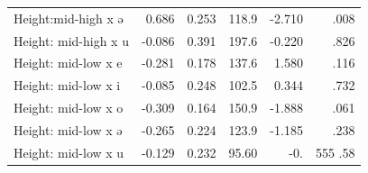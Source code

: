 \documentclass[12pt]{ouparticle}
\begin{document}
\begin{table}[h!]
\begin{tabular}{l | r r r r r}
Height:mid-high x ə  &   0.686 & 0.253  & 118.9    & -2.710  & .008   \\
Height: mid-high x u &  -0.086 & 0.391  & 197.6    & -0.220  & .826    \\
Height: mid-low x e  &  -0.281 & 0.178  & 137.6    &  1.580  & .116    \\
Height: mid-low x i  &  -0.085 & 0.248  & 102.5    &  0.344  & .732 \\
Height: mid-low x o  &  -0.309 & 0.164  & 150.9    & -1.888  & .061  \\
Height: mid-low x ə  &  -0.265 & 0.224  & 123.9    & -1.185  & .238    \\
Height: mid-low x u  &  -0.129 & 0.232  & 95.60    & -0.  &555 .58    \\

\end{tabular}
\end{table}

\newpage
\end{document}
